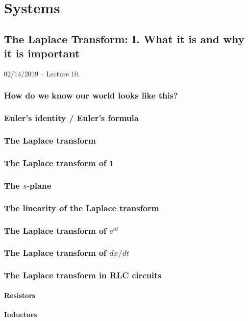 \documentclass[11pt]{book}
\begin{document}
\part{Systems}



\chapter{The Laplace Transform: I. What it is and why it is important}
02/14/2019 – Lecture 10. 
\section{How do we know our world looks like this?}
\section{Euler's identity / Euler's formula}
\section{The Laplace transform}
\section{The Laplace transform of 1}
\section{The $s$-plane}
\section{The linearity of the Laplace transform}
\section{The Laplace transform of $e^{at}$}
\section{The Laplace transform of $dx/dt$}
\section{The Laplace transform in RLC circuits}
\subsection{Resistors}
\subsection{Inductors}
\end{document}
